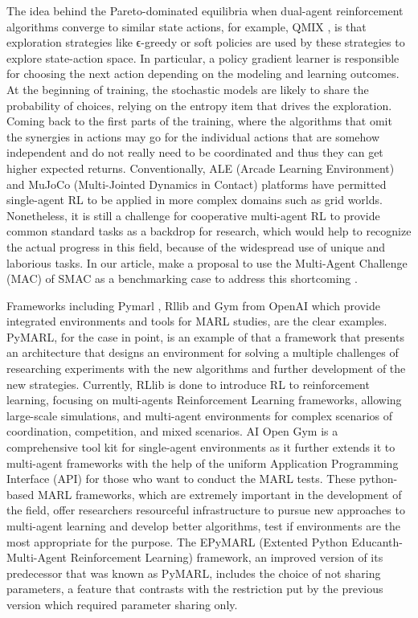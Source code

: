 \documentclass[11pt]{article}
\begin{document}
The idea behind the Pareto-dominated equilibria when dual-agent reinforcement algorithms converge to similar state actions, for example, QMIX \cite{rashid2020monotonic}, is that exploration strategies like ϵ-greedy or soft policies are used by these strategies to explore state-action space. In particular, a policy gradient learner is responsible for choosing the next action depending on the modeling and learning outcomes. At the beginning of training, the stochastic models are likely to share the probability of choices, relying on the entropy item that drives the exploration. Coming back to the first parts of the training, where the algorithms that omit the synergies in actions may go for the individual actions that are somehow independent and do not really need to be coordinated and thus they can get higher expected returns. Conventionally, ALE (Arcade Learning Environment) and MuJoCo (Multi-Jointed Dynamics in Contact) platforms have permitted single-agent RL to be applied in more complex domains such as grid worlds. Nonetheless, it is still a challenge for cooperative multi-agent RL to provide common standard tasks as a backdrop for research, which would help to recognize the actual progress in this field, because of the widespread use of unique and laborious tasks. In our article, make a proposal to use the Multi-Agent Challenge (MAC) of SMAC as a benchmarking case to address this shortcoming \cite{samvelyan19smac}.

Frameworks including Pymarl \cite{samvelyan19smac}, Rllib \cite {liang2018rllib} and Gym from OpenAI \cite{1606.01540} which provide integrated environments and tools for MARL studies, are the clear examples. PyMARL, for the case in point, is an example of that a framework that presents an architecture that designs an environment for solving a multiple challenges of researching experiments with the new algorithms and further development of the new strategies. Currently, RLlib is done to introduce RL to reinforcement learning, focusing on multi-agents Reinforcement Learning frameworks, allowing large-scale simulations, and multi-agent environments for complex scenarios of coordination, competition, and mixed scenarios. AI Open Gym is a comprehensive tool kit for single-agent environments as it further extends it to multi-agent frameworks with the help of the uniform Application Programming Interface (API) for those who want to conduct the MARL tests. These python-based MARL frameworks, which are extremely important in the development of the field, offer researchers resourceful infrastructure to pursue new approaches to multi-agent learning and develop better algorithms, test if environments are the most appropriate for the purpose. The EPyMARL (Extented Python Educanth-Multi-Agent Reinforcement Learning) framework, an improved version of its predecessor that was known as PyMARL, includes the choice of not sharing parameters, a feature that contrasts with the restriction put by the previous version which required parameter sharing only.
\end{document}
